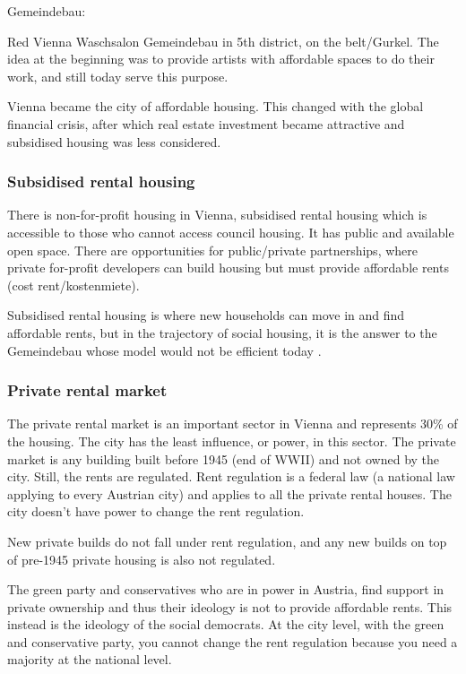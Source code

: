 \documentclass{article}
\newcommand{\alignedmarginpar}[1]{%
        \marginpar{\raggedright\small #1}
    }
\begin{document}
Gemeindebau:
\begin{outline}
	\1 Red Vienna Waschsalon
	\1 Gemeindebau in 5th district, on the belt/Gurkel. The idea at the beginning was to provide artists with affordable spaces to do their work, and still today serve this purpose.
\end{outline}

Vienna became the city of affordable housing. This changed with the global financial crisis, after which real estate investment became attractive and subsidised housing was less considered.

\subsubsection{Subsidised rental housing}

There is non-for-profit housing in Vienna, subsidised rental housing which is accessible to those who cannot access council housing. It has public and available open space. 
There are opportunities for public/private partnerships, where private for-profit developers can build housing but must provide affordable rents (cost rent/kostenmiete).

Subsidised rental housing is where new households can move in and find affordable rents, but in the trajectory of social housing, it is the answer to the Gemeindebau whose model would not be efficient today\alignedmarginpar{Why?}.

\subsubsection{Private rental market}

The private rental market is an important sector in Vienna and represents 30\% of the housing. The city has the least influence, or power, in this sector.
The private market is any building built before 1945 (end of WWII) and not owned by the city. Still, the rents are regulated. Rent regulation is a federal law (a national law applying to every Austrian city) and applies to all the private rental houses. The city doesn't have power to change the rent regulation.

New private builds do not fall under rent regulation, and any new builds on top of pre-1945 private housing is also not regulated.

The green party and conservatives who are in power in Austria, find support in private ownership and thus their ideology is not to provide affordable rents. This instead is the ideology of the social democrats. At the city level, with the green and conservative party, you cannot change the rent regulation because you need a majority at the national level. 
\end{document}
